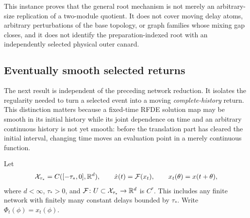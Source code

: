 This instance proves that the general root mechanism is not merely an
arbitrary-size replication of a two-module quotient.  It does not cover
moving delay atoms, arbitrary perturbations of the base topology, or graph
families whose mixing gap closes, and it does not identify the
preparation-indexed root with an independently selected physical outer
canard.

\subsection{Eventually smooth selected returns}

The next result is independent of the preceding network reduction.  It
isolates the regularity needed to turn a selected event into a moving
\emph{complete-history} return.  This distinction matters because a
fixed-time RFDE solution map may be smooth in its initial history while its
joint dependence on time and an arbitrary continuous history is not yet
smooth: before the translation part has cleared the initial interval,
changing time moves an evaluation point in a merely continuous function.

Let
\begin{equation}
 \mathcal X_{\tau_*}=C([-\tau_*,0],\mathbb R^d),\qquad
 \dot x(t)=\mathcal F(x_t),
 \qquad x_t(\theta)=x(t+\theta),                      \label{eq:general-rfde}
\end{equation}
where \(d<\infty\), \(\tau_*>0\), and
\(\mathcal F\colon U\subset\mathcal X_{\tau_*}\to\mathbb R^d\) is \(C^r\).  This includes any
finite network with finitely many constant delays bounded by \(\tau_*\).
Write \(\Phi_t(\phi)=x_t(\phi)\).

